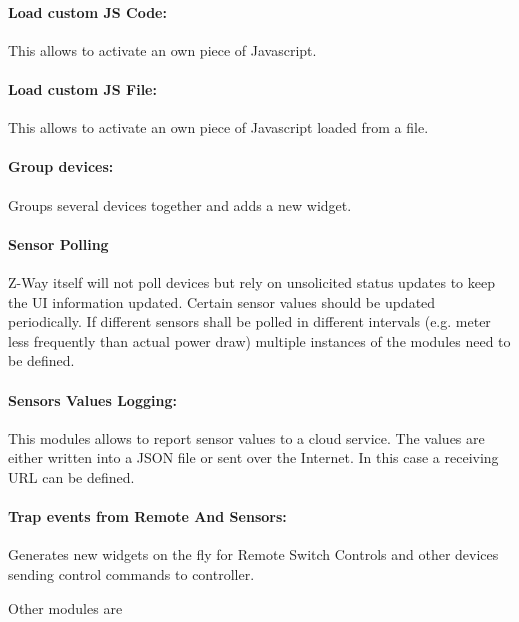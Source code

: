 \paragraph{Load custom JS Code: } This allows to activate an own piece of 
Javascript.

\paragraph{Load custom JS File: } This allows to activate an own piece of 
Javascript loaded from a file.

\paragraph{Group devices: } Groups several devices together and adds a 
new widget.

\paragraph{Sensor Polling} Z-Way itself will not poll devices 
but rely on unsolicited status updates to keep the UI information updated.
Certain sensor values should be updated periodically.  If different
sensors shall be polled in different intervals (e.g. meter less frequently 
than actual power draw) multiple instances of the modules need to be defined.

\paragraph{Sensors Values Logging: } This modules allows to report sensor values 
to a cloud service. The values are either written into a JSON file or  sent over the 
Internet. In this case a receiving URL can be defined.

\paragraph{Trap events from Remote And Sensors: } Generates new widgets on the fly for 
Remote Switch Controls and other devices sending control commands to 
controller.

Other modules are

